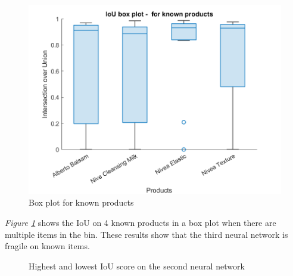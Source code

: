 \begin{figure}[h]
 \centering
 \includegraphics[width=1\textwidth]{graphics/results/v3boxplotForKnownProducts.png}
 \caption{Box plot for known products}
 \label{fig:v3boxknownproducts}
\end{figure}
\textit{Figure \ref{fig:v3boxknownproducts}} shows the IoU on 4 known products in a box plot when there are multiple items in the bin. These results show that the third neural network is fragile on known items.

\begin{figure}[h]
 \centering
 \hspace{0.5cm}
 \caption{Highest and lowest IoU score on the second neural network}
 \label{figure: v3bestworst}
\end{figure}

